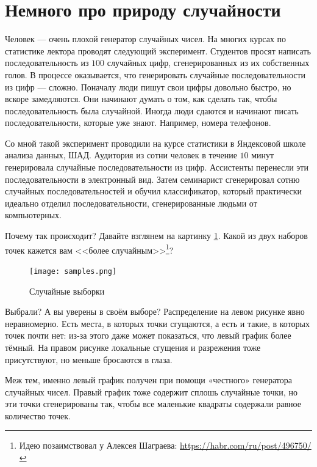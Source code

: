 \documentclass[12pt, a4paper, oneside]{article}
\begin{document}
\section{Немного про природу случайности}

Человек --- очень плохой генератор случайных чисел. На многих курсах по статистике лектора проводят следующий эксперимент. Студентов просят написать последовательность из $100$ случайных цифр, сгенерированных из их собственных голов. В процессе оказывается, что генерировать случайные последовательности из цифр --- сложно. Поначалу люди пишут свои цифры довольно быстро, но вскоре замедляются. Они начинают думать о том, как сделать так, чтобы последовательность была случайной. Иногда люди сдаются и начинают писать последовательности, которые уже знают. Например, номера телефонов. 

Со мной такой эксперимент проводили на курсе статистики в Яндексовой школе анализа данных, ШАД. Аудитория из сотни человек в течение $10$ минут генерировала случайные последовательности из цифр. Ассистенты перенесли эти последовательности в электронный вид. Затем семинарист сгенерировал сотню случайных последовательностей и обучил классификатор, который практически идеально отделил последовательности, сгенерированные людьми от компьютерных.

Почему так происходит? Давайте взглянем на картинку \ref{pic:random_unifrom}.  Какой из двух наборов точек кажется вам <<более случайным>>\footnote{Идею позаимствовал у Алексея Шаграева: \url{https://habr.com/ru/post/496750/}}?

\begin{figure}[H]
\begin{center}
\texttt{[image: samples.png]}
\caption{Случайные выборки}\label{pic:random_unifrom}
\end{center}
\end{figure}

 Выбрали? А вы уверены в своём выборе? Распределение на левом рисунке явно неравномерно. Есть места, в которых точки сгущаются, а есть и такие, в которых точек почти нет: из-за этого даже может показаться, что левый график более тёмный. На правом рисунке локальные сгущения и разрежения тоже присутствуют, но меньше бросаются в глаза.

Меж тем, именно левый график получен при помощи «честного» генератора случайных чисел. Правый график тоже содержит сплошь случайные точки, но эти точки сгенерированы так, чтобы все маленькие квадраты содержали равное количество точек.
\end{document}
